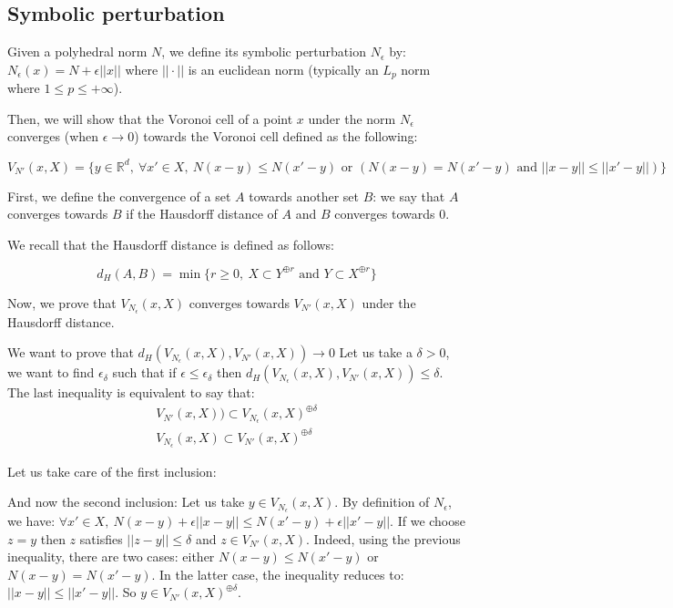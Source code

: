 
\subsection{Symbolic perturbation}

Given a polyhedral norm $ N $, we define its symbolic perturbation $ N_\epsilon
$ by: $ N_\epsilon (x) = N + \epsilon || x || $ where $ || \cdot || $ is an
euclidean norm (typically an $ L_p $ norm where $ 1 \leq p \leq +\infty $).

Then, we will show that the Voronoi cell of a point $ x $ under the norm $
N_\epsilon $ converges (when $ \epsilon \rightarrow 0 $) towards the Voronoi
cell defined as the following:

$$ V_{N'}(x, X) = \{ y \in \mathbb{R}^d,~\forall x' \in X,~N(x - y) \leq N(x'
-y) \text{ or } (N(x - y) = N(x' - y) \text { and } || x -y || \leq || x' - y ||) \} $$

First, we define the convergence of a set $ A $ towards another set $ B $: we
say that $ A $ converges towards $ B $ if the Hausdorff distance of $ A $ and $
B $ converges towards $ 0 $.

We recall that the Hausdorff distance is defined as follows:

$$ d_H(A, B) = \min \{ r \geq 0,~X \subset Y^{\oplus r} \text{ and } Y \subset
X^{\oplus r} \} $$

Now, we prove that $ V_{N_\epsilon}(x, X) $ converges towards $ V_{N'}(x, X) $
under the Hausdorff distance.

We want to prove that $ d_H(V_{N_\epsilon}(x, X), V_{N'}(x, X)) \rightarrow 0 $
Let us take a $ \delta > 0 $, we want to find $ \epsilon_\delta $ such that if $
\epsilon \leq \epsilon_\delta $ then $ d_H(V_{N_\epsilon}(x, X), V_{N'}(x, X))
\leq \delta $. The last inequality is equivalent to say that:
\begin{align}
    V_{N'}(x, X)) \subset V_{N_\epsilon}(x, X)^{\oplus \delta} \\
    V_{N_\epsilon}(x, X) \subset V_{N'}(x, X)^{\oplus \delta}
    \label{eqn:haussdorf-voronoi1}
\end{align}

Let us take care of the first inclusion:

And now the second inclusion:
Let us take $ y \in V_{N_\epsilon}(x, X) $. By definition of $ N_\epsilon $, we
have: $ \forall x' \in X,~N(x - y) + \epsilon || x - y || \leq N(x' - y) +
\epsilon || x' - y || $. If we choose $ z = y $ then $ z $ satisfies $ || z - y
|| \leq \delta $ and $ z \in V_{N'}(x, X) $. Indeed, using the previous
inequality, there are two cases: either $ N(x - y) \leq N(x' - y) $ or $ N(x -
y) = N(x' - y) $. In the latter case, the inequality reduces to: $ || x - y || \leq
|| x' - y || $. So $ y \in V_{N'}(x, X)^{\oplus \delta} $.

